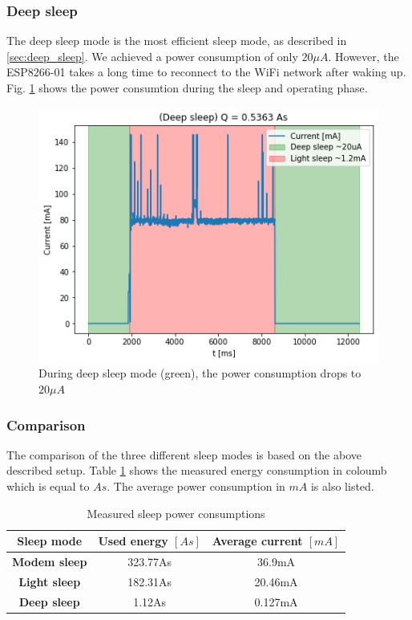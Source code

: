 \subsubsection{Deep sleep}
The deep sleep mode is the most efficient sleep mode, as described in \ref{sec:deep_sleep}. 
We achieved a power consumption of only $20 \mu A$. 
However, the ESP8266-01 takes a long time to reconnect to the WiFi network after waking up.
Fig. \ref{fig:deep_sleep} shows the power consumtion during the sleep and operating phase.
\begin{figure}[h]
    \includegraphics[width = \linewidth]{fig/deep_sleep.png}
    \caption{During deep sleep mode (green), the power consumption drops to $20 \mu A$}
    \label{fig:deep_sleep}
\end{figure}

\subsubsection{Comparison}
The comparison of the three different sleep modes is based on the above described setup.
Table \ref{tab:sleep_modes_15min} shows the measured energy consumption in coloumb which is equal to $As$.
The average power consumption in $mA$ is also listed.

\begin{table}[htbp]
\caption{Measured sleep power consumptions}
\begin{center}
\begin{tabular}{|c|c|c|}
\hline
\textbf{Sleep mode}&\textbf{Used energy $[As]$}&\textbf{Average current $[mA]$}\\
\hline
\textbf{Modem sleep} & 323.77As & 36.9mA\\
\textbf{Light sleep} & 182.31As & 20.46mA\\
\textbf{Deep sleep}  & 1.12As   & 0.127mA\\
\hline
\end{tabular}
\label{tab:sleep_modes_15min}
\end{center}
\end{table}

